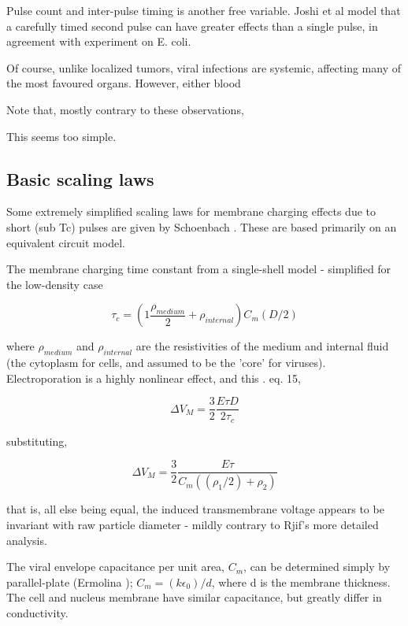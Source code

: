 \documentclass[fleqn,10pt]{article}
\begin{document}
Pulse count and inter-pulse timing is another free variable. Joshi et al \cite{Selfconsistent2001} model that a carefully timed second pulse can have greater effects than a single pulse, in agreement with experiment on E. coli.



Of course, unlike localized tumors, viral infections are systemic, affecting many of the most favoured organs. However, either blood 

Note that, mostly contrary to these observations, 


\cite{Nanosecond2006b} 


This seems too simple.



\subsection*{Basic scaling laws}

Some extremely simplified scaling laws for membrane charging effects due to short (sub Tc) pulses are given by Schoenbach \cite{Bioelectric2007}. These are based primarily on an equivalent circuit model.

The membrane charging time constant from a single-shell model \cite{Ultrashort2004} - simplified for the low-density case

$$\tau_c = \left(1 \frac{\rho_{medium}}{2} + \rho_{internal}\right) C_m (D/2)$$

where $\rho_{medium}$ and $\rho_{internal}$ are the resistivities of the medium and internal fluid (the cytoplasm for cells, and assumed to be the 'core' for viruses). Electroporation is a highly nonlinear effect, and this . \cite{Bioelectric2007} eq. 15, 

$$\Delta V_M = \frac{3}{2}\frac{E\tau D}{2 \tau_c }$$

substituting,

$$\Delta V_M = \frac{3}{2}\frac{E \tau}{C_m ((\rho_1/2) + \rho_2)}$$

that is, all else being equal, the induced transmembrane voltage appears to be invariant with raw particle diameter - mildly contrary to Rjif's more detailed analysis.

The viral envelope capacitance per unit area, $C_m$, can be determined simply by parallel-plate (Ermolina \cite{Study2001}); $C_m = (k\epsilon_0) / d$, where d is the membrane thickness. The cell and nucleus membrane have similar capacitance, but greatly differ in conductivity. 
\end{document}
